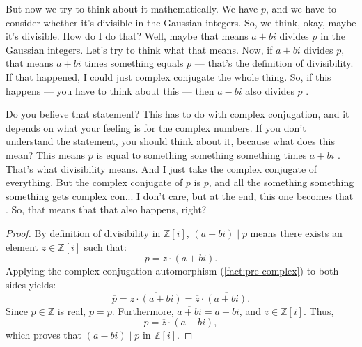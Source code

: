 \begin{speech}[00:04:08 - 00:05:18]
But now we try to think about it mathematically. We have $p$, and we have to consider whether it's divisible in the Gaussian integers. So, we think, okay, maybe it's divisible. How do I do that? Well, maybe that means $a + bi$ divides $p$  in the Gaussian integers. Let's try to think what that means. Now, if $a + bi$ divides $p$, that means $a + bi$ times something equals $p$ --- that's the definition of divisibility. If that happened, I could just complex conjugate the whole thing. So, if this happens --- you have to think about this --- then $a - bi$ also divides $p$ .

Do you believe that statement? This has to do with complex conjugation, and it depends on what your feeling is for the complex numbers. If you don't understand the statement, you should think about it, because what does this mean? This means $p$ is equal to something something something times $a + bi$ . That's what divisibility means. And I just take the complex conjugate of everything. But the complex conjugate of $p$ is $p$, and all the something something something gets complex con... I don't care, but at the end, this one becomes that . So, that means that that also happens, right?
\end{speech}

\begin{content}

\begin{proof}
By definition of divisibility in $\mathbb{Z}[i]$, $(a + bi) \mid p$ means there exists an element $z \in \mathbb{Z}[i]$ such that:
\[
p = z \cdot (a + bi).
\]
Applying the complex conjugation automorphism (\cref{fact:pre-complex}) to both sides yields:
\[
\overline{p} = \overline{z \cdot (a + bi)} = \overline{z} \cdot \overline{(a + bi)}.
\]
Since $p \in \mathbb{Z}$ is real, $\overline{p} = p$. Furthermore, $\overline{a + bi} = a - bi$, and $\overline{z} \in \mathbb{Z}[i]$. Thus,
\[
p = \overline{z} \cdot (a - bi),
\]
which proves that $(a - bi) \mid p$ in $\mathbb{Z}[i]$.
\end{proof}
\end{content}

